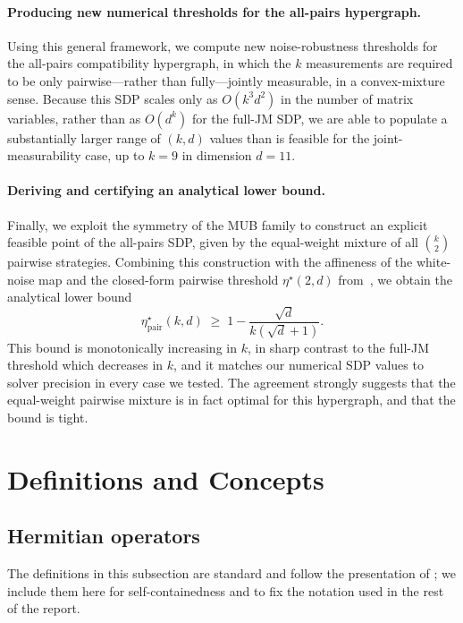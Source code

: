 \documentclass[oneside, a4paper, onecolumn, 11pt]{article}
\theoremstyle{definition}
\theoremstyle{plain}
\theoremstyle{remark}
\begin{document}
\paragraph{Producing new numerical thresholds for the all-pairs hypergraph.} Using this general framework, we compute new noise-robustness thresholds for the all-pairs compatibility hypergraph, in which the $k$ measurements are required to be only pairwise---rather than fully---jointly measurable, in a convex-mixture sense. Because this SDP scales only as $O(k^3 d^2)$ in the number of matrix variables, rather than as $O(d^k)$ for the full-JM SDP, we are able to populate a substantially larger range of $(k,d)$ values than is feasible for the joint-measurability case, up to $k=9$ in dimension $d=11$.

\paragraph{Deriving and certifying an analytical lower bound.} Finally, we exploit the symmetry of the MUB family to construct an explicit feasible point of the all-pairs SDP, given by the equal-weight mixture of all $\binom{k}{2}$ pairwise strategies. Combining this construction with the affineness of the white-noise map and the closed-form pairwise threshold $\eta^\star(2,d)$ from~\cite{Designolle2019}, we obtain the analytical lower bound
\begin{equation}
    \eta^\star_{\mathrm{pair}}(k,d) \;\geq\; 1 - \frac{\sqrt{d}}{k(\sqrt{d}+1)}.
\end{equation}
This bound is monotonically increasing in $k$, in sharp contrast to the full-JM threshold which decreases in $k$, and it matches our numerical SDP values to solver precision in every case we tested. The agreement strongly suggests that the equal-weight pairwise mixture is in fact optimal for this hypergraph, and that the bound is tight.

\section{Definitions and Concepts}

\subsection{Hermitian operators}

The definitions in this subsection are standard and follow the
presentation of \cite{Quantum-Computation-and-Quantum-Information}; we include them here for
self-containedness and to fix the notation used in the rest of the
report.
\end{document}

